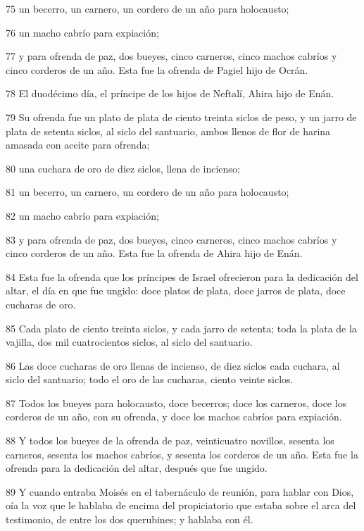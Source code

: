 \par 75 un becerro, un carnero, un cordero de un año para holocausto;
\par 76 un macho cabrío para expiación;
\par 77 y para ofrenda de paz, dos bueyes, cinco carneros, cinco machos cabríos y cinco corderos de un año. Esta fue la ofrenda de Pagiel hijo de Ocrán.
\par 78 El duodécimo día, el príncipe de los hijos de Neftalí, Ahira hijo de Enán.
\par 79 Su ofrenda fue un plato de plata de ciento treinta siclos de peso,  y un jarro de plata de setenta siclos, al siclo del santuario, ambos llenos de flor de harina amasada con aceite para ofrenda;
\par 80 una cuchara de oro de diez siclos,  llena de incienso;
\par 81 un becerro, un carnero, un cordero de un año para holocausto;
\par 82 un macho cabrío para expiación;
\par 83 y para ofrenda de paz, dos bueyes, cinco carneros, cinco machos cabríos y cinco corderos de un año. Esta fue la ofrenda de Ahira hijo de Enán.
\par 84 Esta fue la ofrenda que los príncipes de Israel ofrecieron para la dedicación del altar, el día en que fue ungido: doce platos de plata, doce jarros de plata, doce cucharas de oro.
\par 85 Cada plato de ciento treinta siclos,  y cada jarro de setenta; toda la plata de la vajilla, dos mil cuatrocientos siclos, al siclo del santuario.
\par 86 Las doce cucharas de oro llenas de incienso, de diez siclos   cada cuchara, al siclo del santuario; todo el oro de las cucharas, ciento veinte siclos.
\par 87 Todos los bueyes para holocausto, doce becerros; doce los carneros, doce los corderos de un año, con su ofrenda, y doce los machos cabríos para expiación.
\par 88 Y todos los bueyes de la ofrenda de paz, veinticuatro novillos, sesenta los carneros, sesenta los machos cabríos, y sesenta los corderos de un año. Esta fue la ofrenda para la dedicación del altar, después que fue ungido.
\par 89 Y cuando entraba Moisés en el tabernáculo de reunión, para hablar con Dios, oía la voz que le hablaba de encima del propiciatorio que estaba sobre el arca del testimonio, de entre los dos querubines; y hablaba con él.

